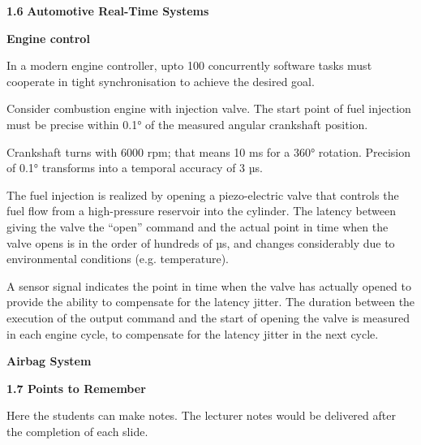 \textbf{1.6} \protect\hypertarget{teil7}{}{}\textbf{Automotive Real-Time
Systems}

\textbf{Engine control}

In a modern engine controller, upto 100 concurrently software tasks must
cooperate in tight synchronisation to achieve the desired goal.

Consider combustion engine with injection valve. The start point of fuel
injection must be precise within 0.1° of the measured angular crankshaft
position.

Crankshaft turns with 6000 rpm; that means 10 ms for a 360° rotation.
Precision of 0.1° transforms into a temporal accuracy of 3 µs.

The fuel injection is realized by opening a piezo-electric valve that
controls the fuel flow from a high-pressure reservoir into the cylinder.
The latency between giving the valve the ``open'' command and the actual
point in time when the valve opens is in the order of hundreds of µs,
and changes considerably due to environmental conditions (e.g.
temperature).

A sensor signal indicates the point in time when the valve has actually
opened to provide the ability to compensate for the latency jitter. The
duration between the execution of the output command and the start of
opening the valve is measured in each engine cycle, to compensate for
the latency jitter in the next cycle.

\textbf{Airbag System}

\protect\hypertarget{teil8}{}{}\textbf{1.7 Points to Remember}

\protect\hypertarget{teil8-1}{}{\protect\hypertarget{teil8}{}{}}

Here the students can make notes. The lecturer notes would be delivered
after the completion of each slide.
